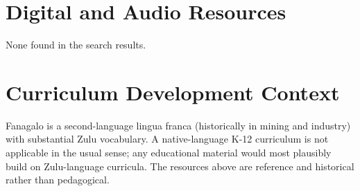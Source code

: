 \documentclass[12pt]{article}
\begin{document}
\section{Digital and Audio Resources}
None found in the search results.

\section{Curriculum Development Context}
Fanagalo is a second-language lingua franca (historically in mining and industry) with substantial Zulu vocabulary. A native-language K-12 curriculum is not applicable in the usual sense; any educational material would most plausibly build on Zulu-language curricula. The resources above are reference and historical rather than pedagogical.
\end{document}
